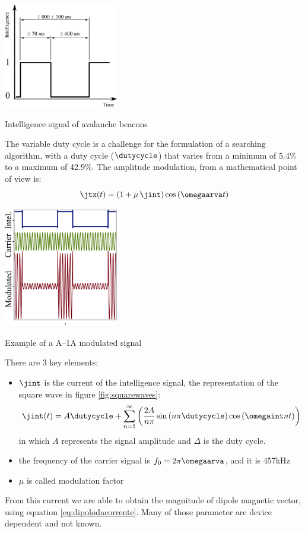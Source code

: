 \begin{marginfigure}
	\centering
	\includegraphics[width=5cm]{ch1/img/artva_signal.pdf}
	\caption{Intelligence signal of avalanche beacons}
	\label{fig:squarewaves}
\end{marginfigure}

The variable duty cycle is a challenge for the formulation of a searching algorithm, with a duty cycle ($\dutycycle$) that varies from a minimum of 5.4\% to a maximum of 42.9\%. The amplitude modulation, from a mathematical point of view is:
\begin{equation}
\jtx(t) = \braces{1+\mu \,\jint}\ccos{\omegaarva t}
\end{equation}
\begin{marginfigure}
	\centering
	\includegraphics[width=5cm]{ch2/img/modulation_example.pdf}
	\caption{Example of a A--1A modulated signal}
\end{marginfigure}
There are 3 key elements:
\begin{itemize}
\item $\jint$ is the current of the intelligence signal, the representation of the square wave in figure \ref{fig:squarewaves}:
\begin{equation}
\jint(t) = A\dutycycle + \sum\limits_{n=1}^{\infty}\braces{\dfrac{2A}{n\pi}\ssin{n\pi \dutycycle} \ccos{\omegaint n t}}
\end{equation}
in which $A$ represents the signal amplitude and $\Delta$ is the duty cycle. 
\item the frequency of the carrier signal is ${f_0 = 2\pi\omegaarva}$, and it is \num{457}\si{\kilo\hertz}
\item $\mu$ is called modulation factor
\end{itemize}
From this current we are able to obtain the magnitude of dipole magnetic vector, using equation \ref{eq:dipolodacorrente}. Many of those parameter are device dependent and not known.




\clearpage



